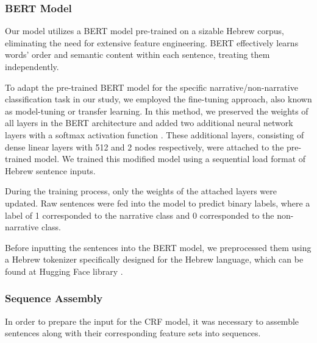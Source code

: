 \documentclass[preprint,12pt]{elsarticle}
\begin{document}
\subsubsection{BERT Model}

Our model utilizes a BERT \cite{devlin2018bert} model pre-trained on a sizable Hebrew corpus, eliminating the need for extensive feature engineering. BERT effectively learns words' order and semantic content within each sentence, treating them independently.

To adapt the pre-trained BERT model for the specific narrative/non-narrative classification task in our study, we employed the fine-tuning approach, also known as model-tuning or transfer learning. In this method, we preserved the weights of all layers in the BERT architecture and added two additional neural network layers with a softmax activation function \cite{devlin2018bert}. These additional layers, consisting of dense linear layers with 512 and 2 nodes respectively, were attached to the pre-trained model. %
We trained this modified model using a sequential load format of Hebrew sentence inputs.


During the training process, only the weights of the attached layers were updated. Raw sentences were fed into the model to predict binary labels, where a label of 1 corresponded to the narrative class and 0 corresponded to the non-narrative class.

Before inputting the sentences into the BERT model, we preprocessed them using a Hebrew tokenizer specifically designed for the Hebrew language, which can be found at Hugging Face library \cite{hugface}.


\subsubsection{Sequence Assembly}
In order to prepare the input for the CRF model, it was necessary to assemble sentences along with their corresponding feature sets into sequences.
\end{document}
